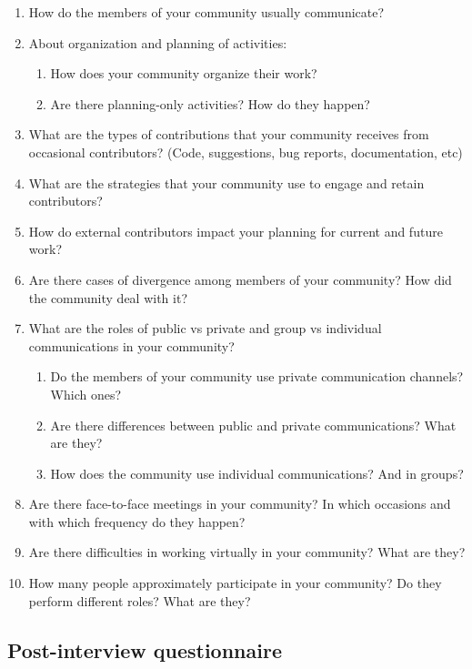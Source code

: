 \documentclass{sigchi}
\begin{document}
\begin{enumerate}
  \item How do the members of your community usually communicate?

  \item About organization and planning of activities:
  \begin{enumerate}
    \item How does your community organize their work?
    \item Are there planning-only activities? How do they happen?
  \end{enumerate}
  \item What are the types of contributions that your community receives from occasional contributors? (Code, suggestions, bug reports, documentation, etc)
  \item What are the strategies that your community use to engage and retain contributors?
  \item How do external contributors impact your planning for current and future work?
  \item Are there cases of divergence among members of your community? How did the community deal with it?
  \item What are the roles of public vs private and group vs individual communications in your community?
  \begin{enumerate}
    \item Do the members of your community use private communication channels? Which ones?
    \item Are there differences between public and private communications? What are they?
    \item How does the community use individual communications? And in groups?
  \end{enumerate}
  \item Are there face-to-face meetings in your community? In which occasions and with which frequency do they happen?
  \item Are there difficulties in working virtually in your community? What are they?
  \item How many people approximately participate in your community? Do they perform different roles? What are they?
\end{enumerate}


\subsection{Post-interview questionnaire}
\end{document}
